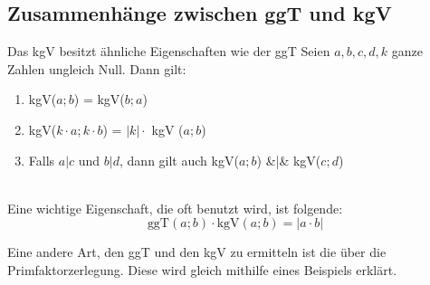 

\subsection{Zusammenhänge zwischen ggT und kgV}


\begin{Theorem}
Das kgV besitzt ähnliche Eigenschaften wie der ggT
Seien $a,b,c,d,k$ ganze Zahlen ungleich Null. Dann gilt:
\begin{enumerate}
\item kgV($a;b$) = kgV($b;a$)
\item kgV($k\cdot a ; k \cdot b$) = $|k| \cdot$ kgV ($a;b$)
\item Falls $a | c$ und $b | d$, dann gilt auch kgV($a;b$) &|& kgV($c;d$)
\end{enumerate}\\

Eine wichtige Eigenschaft, die oft benutzt wird, ist folgende:
$$\text{ggT}(a;b) \cdot \text{kgV}(a;b) = |a \cdot b|$$

Eine andere Art, den ggT und den kgV zu ermitteln ist die über die Primfaktorzerlegung. Diese wird gleich mithilfe eines Beispiels erklärt.
\end{Theorem}

